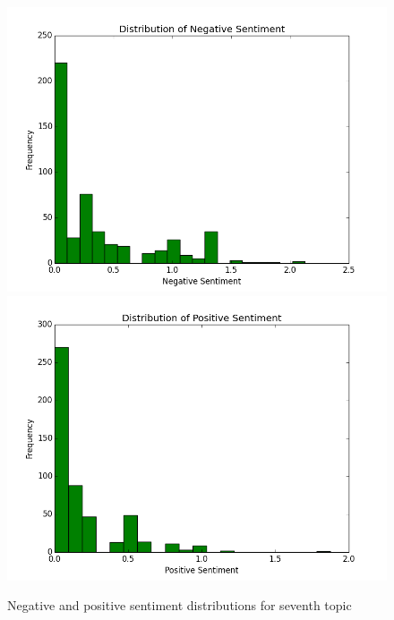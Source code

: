 \documentclass{article}
\begin{document}
\begin{enumerate}
		\begin{figure}[H]
			\includegraphics[scale=0.35]{6neg.png}
			\includegraphics[scale=0.35]{6pos.png}
			\begin{center}
			\caption{Negative and positive sentiment distributions for seventh topic}
			\end{center}
		\end{figure}
		

\end{enumerate}
\end{document}
